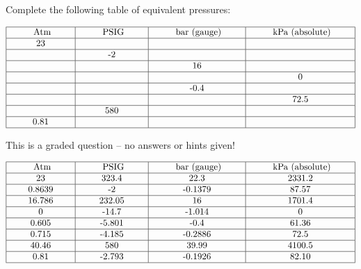 

Complete the following table of equivalent pressures:


$$\vbox{\offinterlineskip
\halign{\strut
\vrule \quad\hfil # \ \hfil & 
\vrule \quad\hfil # \ \hfil & 
\vrule \quad\hfil # \ \hfil & 
\vrule \quad\hfil # \ \hfil \vrule \cr
\noalign{\hrule}
%
\hskip 20pt Atm \hskip 20pt & \hskip 20pt PSIG \hskip 20pt & \hskip 20pt bar (gauge) \hskip 20pt & \hskip 20pt kPa (absolute) \hskip 20pt \cr
%
\noalign{\hrule}
%
23 &  &  &  \cr
%
\noalign{\hrule}
%
  & -2 &  &  \cr
%
\noalign{\hrule}
%
  &  & 16 &  \cr
%
\noalign{\hrule}
%
  &  &  & 0 \cr
%
\noalign{\hrule}
%
  &  & -0.4 &  \cr
%
\noalign{\hrule}
%
  &  &  & 72.5 \cr
%
\noalign{\hrule}
%
  & 580 &  &  \cr
%
\noalign{\hrule}
%
0.81 &  &  &  \cr
%
\noalign{\hrule}
} %
}$$ %


\vfil 

\eject






This is a graded question -- no answers or hints given!








$$\vbox{\offinterlineskip
\halign{\strut
\vrule \quad\hfil # \ \hfil & 
\vrule \quad\hfil # \ \hfil & 
\vrule \quad\hfil # \ \hfil & 
\vrule \quad\hfil # \ \hfil \vrule \cr
\noalign{\hrule}
%
\hskip 20pt Atm \hskip 20pt & \hskip 20pt PSIG \hskip 20pt & \hskip 20pt bar (gauge) \hskip 20pt & \hskip 20pt kPa (absolute) \hskip 20pt \cr
%
\noalign{\hrule}
%
23 & 323.4 & 22.3 & 2331.2 \cr
%
\noalign{\hrule}
%
0.8639 & -2 & -0.1379 & 87.57 \cr
%
\noalign{\hrule}
%
16.786 & 232.05 & 16 & 1701.4 \cr
%
\noalign{\hrule}
%
0 & -14.7 & -1.014 & 0 \cr
%
\noalign{\hrule}
%
0.605 & -5.801 & -0.4 & 61.36 \cr
%
\noalign{\hrule}
%
0.715 & -4.185 & -0.2886 & 72.5 \cr
%
\noalign{\hrule}
%
40.46 & 580 & 39.99 & 4100.5 \cr
%
\noalign{\hrule}
%
0.81 & -2.793 & -0.1926 & 82.10 \cr
%
\noalign{\hrule}
} %
}$$ %





